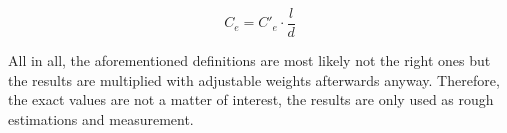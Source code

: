 \begin{equation}
	\label{eq:edge_capacitance}
	C_e = C'_e \cdot \frac{l}{d}
\end{equation}

All in all, the aforementioned definitions are most likely not the right ones but the results are multiplied with adjustable weights afterwards anyway. Therefore, the exact values are not a matter of interest, the results are only used as rough estimations and measurement.






